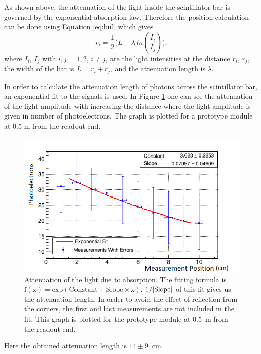 \documentclass[a4paper]{article}\linespread{1.4}
\begin{document}
As shown above, the attenuation of the light inside the scintillator bar is governed by the exponential absorption law.
Therefore the position calculation can be done using Equation \ref{eq:bul} which gives
\begin{equation} \label{eq:pos} r_{i}=\frac{1}{2} \Big(L - \lambda~ln(\frac{I_{i}}{I_{j}})\Big), \end{equation}
where $I_{i}$, $I_{j}$ with $i, j=1,2$, $i\neq j$, are the light intensities at the distance $r_{i}$, $r_{j}$, the width of the bar is $L=r_{i}+r_{j}$, and the attenuation length is $\lambda$. 

In order to calculate the attenuation length of photons across the scintillator bar, an exponential fit to the signals is used. In Figure \ref{fig:mamafi} one can see the attenuation of the light amplitude with increasing the distance where the light amplitude is given in number of photoelectrons. %
The graph is plotted for a prototype module at 0.5 m from the readout end.
\begin{figure}[h!] \hspace*{-0.7cm}  \includegraphics[width=130mm,scale=1.0]{figures/un.png} \caption{Attenuation of the light due to absorption. The fitting formula is $\mathrm{f(x) = exp(Constant + Slope\times x)}$. $\mathrm{1/ \abs{Slope}}$ of this fit gives us the attenuation length. In order to avoid the effect of reflection from the corners, the first and last measurements are not included in the fit. This graph is plotted for the prototype module at 0.5~m from the readout end.} \label{fig:mamafi}\end{figure}  
Here the obtained attenuation length is $14 \pm 9$~cm. %
\end{document}

